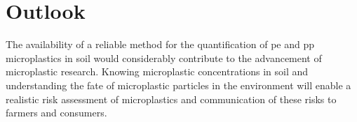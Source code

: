 \documentclass[justified,a4paper,
	nofonts,
	nobib
]{tufte-handout}
\begin{document}
\section{Outlook}\label{sec:outlook}

The availability of a reliable method for the quantification of \ac{pe} and \ac{pp} microplastics in soil would considerably contribute to the advancement of microplastic research. Knowing microplastic concentrations in soil and understanding the fate of microplastic particles in the environment will enable a realistic risk assessment of microplastics and communication of these risks to farmers and consumers.

\begin{fullwidth}
	\printbibliography[notcategory=ignore]
\end{fullwidth}
\end{document}
